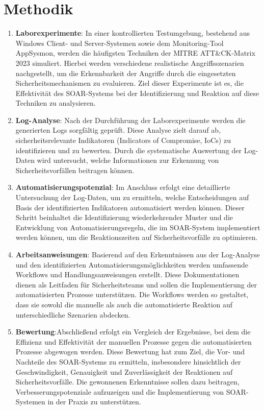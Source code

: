 \newpage
\section{Methodik} \label{latexDetails}
\begin{enumerate}
\item \textbf{Laborexperimente}: In einer kontrollierten Testumgebung, bestehend aus Windows Client- und Server-Systemen sowie dem Monitoring-Tool AppSysmon, werden die häufigsten Techniken der MITRE ATT\&CK-Matrix 2023 simuliert. Hierbei werden verschiedene realistische Angriffsszenarien nachgestellt, um die Erkennbarkeit der Angriffe durch die eingesetzten Sicherheitsmechanismen zu evaluieren. Ziel dieser Experimente ist es, die Effektivität des SOAR-Systems bei der Identifizierung und Reaktion auf diese Techniken zu analysieren.
\item \textbf{Log-Analyse}: Nach der Durchführung der Laborexperimente werden die generierten Logs sorgfältig geprüft. Diese Analyse zielt darauf ab, sicherheitsrelevante Indikatoren (Indicators of Compromise, IoCs) zu identifizieren und zu bewerten. Durch die systematische Auswertung der Log-Daten wird untersucht, welche Informationen zur Erkennung von Sicherheitsvorfällen beitragen können.
\item \textbf{Automatisierungspotenzial}: Im Anschluss erfolgt eine detaillierte Untersuchung der Log-Daten, um zu ermitteln, welche Entscheidungen auf Basis der identifizierten Indikatoren automatisiert werden können. Dieser Schritt beinhaltet die Identifizierung wiederkehrender Muster und die Entwicklung von Automatisierungsregeln, die im SOAR-System implementiert werden können, um die Reaktionszeiten auf Sicherheitsvorfälle zu optimieren.
\item \textbf{Arbeitsanweisungen}: Basierend auf den Erkenntnissen aus der Log-Analyse und den identifizierten Automatisierungsmöglichkeiten werden umfassende Workflows und Handlungsanweisungen erstellt. Diese Dokumentationen dienen als Leitfaden für Sicherheitsteams und sollen die Implementierung der automatisierten Prozesse unterstützen. Die Workflows werden so gestaltet, dass sie sowohl die manuelle als auch die automatisierte Reaktion auf unterschiedliche Szenarien abdecken.
\item \textbf{Bewertung}:Abschließend erfolgt ein Vergleich der Ergebnisse, bei dem die Effizienz und Effektivität der manuellen Prozesse gegen die automatisierten Prozesse abgewogen werden. Diese Bewertung hat zum Ziel, die Vor- und Nachteile des SOAR-Systems zu ermitteln, insbesondere hinsichtlich der Geschwindigkeit, Genauigkeit und Zuverlässigkeit der Reaktionen auf Sicherheitsvorfälle. Die gewonnenen Erkenntnisse sollen dazu beitragen, Verbesserungspotenziale aufzuzeigen und die Implementierung von SOAR-Systemen in der Praxis zu unterstützen.
\end{enumerate}
